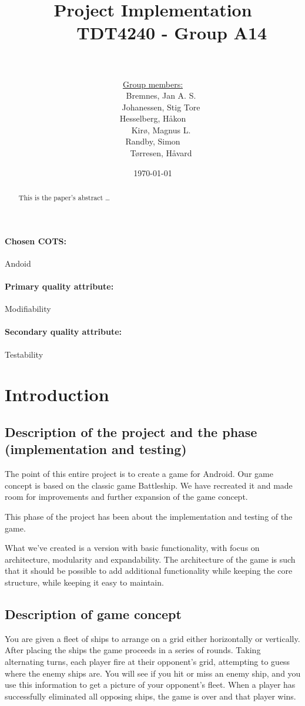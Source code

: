 \documentclass[12pt, a4paper]{article}
\title{
	Project Implementation \\
    TDT4240 - Group A14 \\
	\\
}
\author{
	\underline{Group members:} \\
    Bremnes, Jan A. S.\\
    Johanessen, Stig Tore\\
	Hesselberg, Håkon \\
    Kirø, Magnus L.\\
	Randby, Simon \\
    Tørresen, Håvard\\
}
\date{\today}
\begin{document}
\maketitle
\paragraph{Chosen COTS:} Andoid
\paragraph{Primary quality attribute:} Modifiability
\paragraph{Secondary quality attribute:} Testability \\


\begin{abstract}
This is the paper's abstract \ldots
\end{abstract}

\newpage
\tableofcontents
\newpage

\section{Introduction}

\subsection{Description of the project and the phase (implementation and
testing)}

The point of this entire project is to create a game for Android. Our game
concept is based on the classic game Battleship. We have recreated it and made
room for improvements and further expansion of the game concept. 

This phase of the project has been about the implementation and testing of the
game.

What we’ve created is a version with basic functionality, with focus on
architecture, modularity and expandability. The architecture of the game is such
that it should be possible to add additional functionality while keeping the
core structure, while keeping it easy to maintain.

\subsection{Description of game concept}
You are given a fleet of ships to arrange on a grid either horizontally or
vertically. After placing the ships the game proceeds in a series of rounds.
Taking alternating turns, each player fire at their opponent’s grid, attempting
to guess where the enemy ships are. You will see if you hit or miss an enemy
ship, and you use this information to get a picture of your opponent’s fleet.
When a player has successfully eliminated all opposing ships, the game is over
and that player wins.
\end{document}
